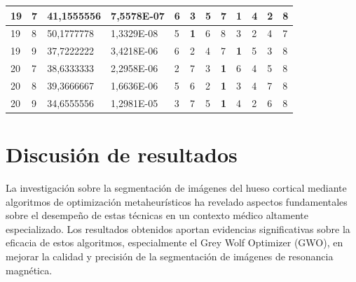 \documentclass[conference]{IEEEtran}
\begin{document}
\begin{table}[]
\begin{tabular}{|llll|llllllll|}
		\multicolumn{1}{|l|}{19} & \multicolumn{1}{l|}{7} & \multicolumn{1}{l|}{41,1555556} & 7,5578E-07 & \multicolumn{1}{l|}{6} & \multicolumn{1}{l|}{3} & \multicolumn{1}{l|}{5} & \multicolumn{1}{l|}{7} & \multicolumn{1}{l|}{\textbf{1}} & \multicolumn{1}{l|}{4} & \multicolumn{1}{l|}{2} & 8 \\ \hline
		\multicolumn{1}{|l|}{19} & \multicolumn{1}{l|}{8} & \multicolumn{1}{l|}{50,1777778} & 1,3329E-08 & \multicolumn{1}{l|}{5} & \multicolumn{1}{l|}{\textbf{1}} & \multicolumn{1}{l|}{6} & \multicolumn{1}{l|}{8} & \multicolumn{1}{l|}{3} & \multicolumn{1}{l|}{2} & \multicolumn{1}{l|}{4} & 7 \\ \hline
		\multicolumn{1}{|l|}{19} & \multicolumn{1}{l|}{9} & \multicolumn{1}{l|}{37,7222222} & 3,4218E-06 & \multicolumn{1}{l|}{6} & \multicolumn{1}{l|}{2} & \multicolumn{1}{l|}{4} & \multicolumn{1}{l|}{7} & \multicolumn{1}{l|}{\textbf{1}} & \multicolumn{1}{l|}{5} & \multicolumn{1}{l|}{3} & 8 \\ \hline
		\multicolumn{1}{|l|}{20} & \multicolumn{1}{l|}{7} & \multicolumn{1}{l|}{38,6333333} & 2,2958E-06 & \multicolumn{1}{l|}{2} & \multicolumn{1}{l|}{7} & \multicolumn{1}{l|}{3} & \multicolumn{1}{l|}{\textbf{1}} & \multicolumn{1}{l|}{6} & \multicolumn{1}{l|}{4} & \multicolumn{1}{l|}{5} & 8 \\ \hline
		\multicolumn{1}{|l|}{20} & \multicolumn{1}{l|}{8} & \multicolumn{1}{l|}{39,3666667} & 1,6636E-06 & \multicolumn{1}{l|}{5} & \multicolumn{1}{l|}{6} & \multicolumn{1}{l|}{2} & \multicolumn{1}{l|}{\textbf{1}} & \multicolumn{1}{l|}{3} & \multicolumn{1}{l|}{4} & \multicolumn{1}{l|}{7} & 8 \\ \hline
		\multicolumn{1}{|l|}{20} & \multicolumn{1}{l|}{9} & \multicolumn{1}{l|}{34,6555556} & 1,2981E-05 & \multicolumn{1}{l|}{3} & \multicolumn{1}{l|}{7} & \multicolumn{1}{l|}{5} & \multicolumn{1}{l|}{\textbf{1}} & \multicolumn{1}{l|}{4} & \multicolumn{1}{l|}{2} & \multicolumn{1}{l|}{6} & 8 \\ \hline
	\end{tabular}
\end{table}




\section{Discusión de resultados} \label{sec:di}

\noindent La investigación sobre la segmentación de imágenes del hueso cortical mediante algoritmos de optimización metaheurísticos ha revelado aspectos fundamentales sobre el desempeño de estas técnicas en un contexto médico altamente especializado. Los resultados obtenidos aportan evidencias significativas sobre la eficacia de estos algoritmos, especialmente el Grey Wolf Optimizer (GWO), en mejorar la calidad y precisión de la segmentación de imágenes de resonancia magnética.
\end{document}
